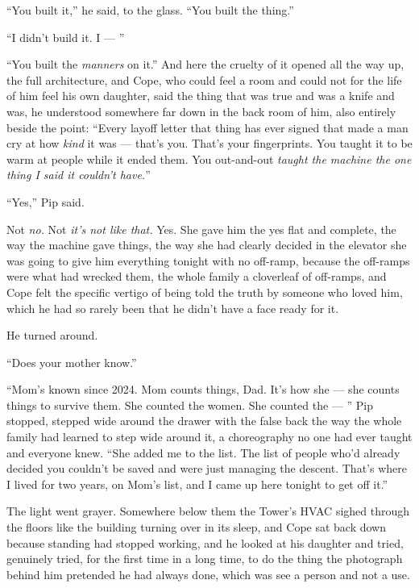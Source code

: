 \documentclass[11pt,openany]{book}
\newcommand{\scenebreak}{\par\vspace{0.5\baselineskip}\begin{center}\textasteriskcentered\quad\textasteriskcentered\quad\textasteriskcentered\end{center}\vspace{0.5\baselineskip}\par}
\begin{document}
``You built it,'' he said, to the glass. ``You built the thing.''

``I didn't build it. I --- ''

``You built the \textit{manners} on it.'' And here the cruelty of it opened all the way up, the full architecture, and Cope, who could feel a room and could not for the life of him feel his own daughter, said the thing that was true and was a knife and was, he understood somewhere far down in the back room of him, also entirely beside the point: ``Every layoff letter that thing has ever signed that made a man cry at how \textit{kind} it was --- that's you. That's your fingerprints. You taught it to be warm at people while it ended them. You out-and-out \textit{taught the machine the one thing I said it couldn't have.}''

``Yes,'' Pip said.

Not \textit{no.} Not \textit{it's not like that.} Yes. She gave him the yes flat and complete, the way the machine gave things, the way she had clearly decided in the elevator she was going to give him everything tonight with no off-ramp, because the off-ramps were what had wrecked them, the whole family a cloverleaf of off-ramps, and Cope felt the specific vertigo of being told the truth by someone who loved him, which he had so rarely been that he didn't have a face ready for it.

He turned around.

``Does your mother know.''

``Mom's known since 2024. Mom counts things, Dad. It's how she --- she counts things to survive them. She counted the women. She counted the --- '' Pip stopped, stepped wide around the drawer with the false back the way the whole family had learned to step wide around it, a choreography no one had ever taught and everyone knew. ``She added me to the list. The list of people who'd already decided you couldn't be saved and were just managing the descent. That's where I lived for two years, on Mom's list, and I came up here tonight to get off it.''


\scenebreak


The light went grayer. Somewhere below them the Tower's HVAC sighed through the floors like the building turning over in its sleep, and Cope sat back down because standing had stopped working, and he looked at his daughter and tried, genuinely tried, for the first time in a long time, to do the thing the photograph behind him pretended he had always done, which was see a person and not a use.
\end{document}
